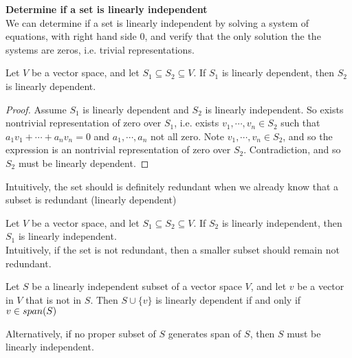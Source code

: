 \documentclass[11pt]{article}
\begin{document}
\begin{defn*}
    \textbf{Determine if a set is linearly independent} \\ 
    We can determine if a set is linearly independent by solving a system of equations, with right hand side 0, and verify that the only solution the the systems are zeros, i.e. trivial representations. 
\end{defn*}


\begin{theorem*}
    Let $V$ be a vector space, and let $S_1 \subseteq S_2 \subseteq V$. If $S_1$ is linearly dependent, then $S_2$ is linearly dependent.
    \begin{proof}
        Assume $S_1$ is linearly dependent and $S_2$ is linearly independent. So exists nontrivial representation of zero over $S_1$, i.e. exists $v_1, \cdots, v_n \in S_2$ such that $a_1v_1 + \cdots + a_nv_n = 0$ and $a_1,\cdots, a_n$ not all zero. Note $v_1, \cdots, v_n \in S_2$, and so the expression is an nontrivial representation of zero over $S_2$. Contradiction, and so $S_2$ must be linearly dependent. 
    \end{proof}
    Intuitively, the set should is definitely redundant when we already know that a subset is redundant (linearly dependent)
\end{theorem*}


\begin{corollary*}
    Let $V$ be a vector space, and let $S_1 \subseteq S_2 \subseteq V$. If $S_2$ is linearly independent, then $S_1$ is linearly independent. \\
    Intuitively, if the set is not redundant, then a smaller subset should remain not redundant.
\end{corollary*}


\begin{theorem*}
    Let $S$ be a linearly independent subset of a vector space $V$, and let $v$ be a vector in $V$ that is not in $S$. Then $S\cup \{ v\}$ is linearly dependent if and only if $v\in span(S)$ 
    \begin{rem}
        Alternatively, if no proper subset of $S$ generates span of $S$, then $S$ must be linearly independent. 
    \end{rem}
\end{theorem*}






\end{document}
